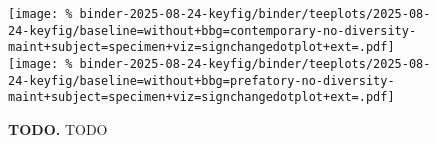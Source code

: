 \begin{figure*}

\texttt{[image: \%
binder-2025-08-24-keyfig/binder/teeplots/2025-08-24-keyfig/baseline=without+bbg=contemporary-no-diversity-maint+subject=specimen+viz=signchangedotplot+ext=.pdf]}%
\texttt{[image: \%
binder-2025-08-24-keyfig/binder/teeplots/2025-08-24-keyfig/baseline=without+bbg=prefatory-no-diversity-maint+subject=specimen+viz=signchangedotplot+ext=.pdf]}

\vspace{-1ex}

\caption{
\textbf{TODO.}
TODO
}
\label{fig:sign-change-nodmaint}

\end{figure*}
